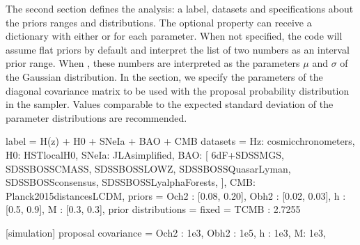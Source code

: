 \documentclass[letterpaper,12pt,english]{sphinxhowto}
\begin{document}
The second section defines the analysis: a label, datasets and specifications
about the priors ranges and distributions.
The optional property  can
receive a dictionary with either  or  for each parameter.
When not specified, the code will assume flat priors by default and interpret
the list of two numbers as an interval prior range.
When , these numbers are interpreted as the parameters \(\mu\)
and \(\sigma\) of the Gaussian distribution.
In the  section, we specify the
parameters of the diagonal covariance matrix to be used with the proposal
probability distribution in the sampler.
Values comparable to the expected standard deviation of the parameter
distributions are recommended.

%
\begin{sphinxVerbatim}[commandchars=\\\{\}]
[analysis]
label = \PYGZdl{}H(z)\PYGZdl{} + \PYGZdl{}H\PYGZus{}0\PYGZdl{} + SNeIa + BAO + CMB 
datasets = \PYGZob{}
    \PYGZsq{}Hz\PYGZsq{}:   \PYGZsq{}cosmic\PYGZus{}chronometers\PYGZsq{},
    \PYGZsq{}H0\PYGZsq{}:   \PYGZsq{}HST\PYGZus{}local\PYGZus{}H0\PYGZsq{},
    \PYGZsq{}SNeIa\PYGZsq{}: \PYGZsq{}JLA\PYGZus{}simplified\PYGZsq{},
    \PYGZsq{}BAO\PYGZsq{}:   [
        \PYGZsq{}6dF+SDSS\PYGZus{}MGS\PYGZsq{},
        \PYGZsq{}SDSS\PYGZus{}BOSS\PYGZus{}CMASS\PYGZsq{},
        \PYGZsq{}SDSS\PYGZus{}BOSS\PYGZus{}LOWZ\PYGZsq{},
        \PYGZsq{}SDSS\PYGZus{}BOSS\PYGZus{}QuasarLyman\PYGZsq{},
        \PYGZsq{}SDSS\PYGZus{}BOSS\PYGZus{}consensus\PYGZsq{}, 
        \PYGZsq{}SDSS\PYGZus{}BOSS\PYGZus{}Lyalpha\PYGZhy{}Forests\PYGZsq{},
        ],
    \PYGZsq{}CMB\PYGZsq{}:   \PYGZsq{}Planck2015\PYGZus{}distances\PYGZus{}LCDM\PYGZsq{},
    \PYGZcb{}
priors = \PYGZob{}
    \PYGZsq{}Och2\PYGZsq{} :  [0.08, 0.20],
    \PYGZsq{}Obh2\PYGZsq{} :  [0.02, 0.03],
    \PYGZsq{}h\PYGZsq{} : [0.5, 0.9],
    \PYGZsq{}M\PYGZsq{} : [\PYGZhy{}0.3, 0.3],
    \PYGZcb{}
prior distributions = 
fixed = \PYGZob{}
    \PYGZsq{}T\PYGZus{}CMB\PYGZsq{} : 2.7255
    \PYGZcb{}

[simulation]
proposal covariance = \PYGZob{}
    \PYGZsq{}Och2\PYGZsq{} : 1e\PYGZhy{}3,
    \PYGZsq{}Obh2\PYGZsq{} : 1e\PYGZhy{}5,
    \PYGZsq{}h\PYGZsq{} : 1e\PYGZhy{}3,
    \PYGZsq{}M\PYGZsq{}: 1e\PYGZhy{}3,
    \PYGZcb{}
\end{sphinxVerbatim}
\end{document}
